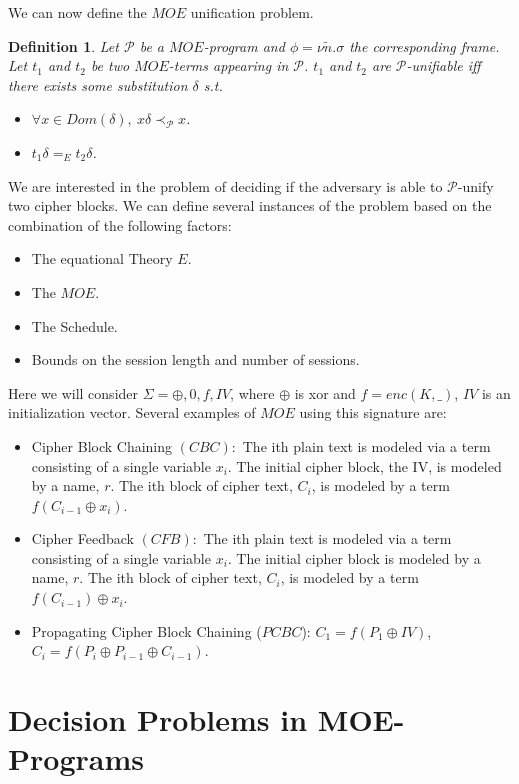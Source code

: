 \documentclass{easychair}
\newtheorem{definition}{Definition}
\begin{document}
We can now define the $MOE$ unification problem.

\begin{definition}
	Let $\mathcal{P}$ be a $MOE$-program and $\phi = \nu \tilde{n}.\sigma$ the corresponding frame. Let $t_1$ and $t_2$
	be two $MOE$-terms appearing in $\mathcal{P}$. $t_1$ and $t_2$
	are $\mathcal{P}$-unifiable iff there exists some substitution
	$\delta$ s.t.
	\begin{itemize}
		\item $\forall x \in Dom(\delta), ~x\delta \prec_{\mathcal{P}} x$.
		\item $t_1 \delta =_E t_2\delta$.
	\end{itemize}
\end{definition}

We are interested in the problem of deciding if the adversary is able to $\mathcal{P}$-unify two cipher blocks. We can define several instances of the problem based on the combination of the following factors:
\begin{itemize}
	\item The equational Theory $E$.
	\item The $MOE$.
	\item The Schedule.
	\item Bounds on the session length and number of sessions.  
\end{itemize}

Here we will consider $\Sigma ={\oplus, 0, f, IV}$, where $\oplus$ is xor and $f=enc(K,\_)$, $IV$ is an initialization vector.
Several examples of $MOE$ using this signature are: 
\begin{itemize}
	\item Cipher Block Chaining $(CBC):$ The ith plain text is modeled via a term consisting of a single variable $x_i$. The initial cipher block, the IV, is modeled by a name, $r$. The ith block of cipher text, $C_i$, is modeled by a
	term $f(C_{i-1} \oplus x_i)$.
	\item Cipher Feedback $(CFB):$ The ith plain text is modeled via a term consisting of a single variable $x_i$. The initial cipher block is modeled by a name, $r$. The ith block of cipher text, $C_i$, is modeled by a
	term $f(C_{i-1}) \oplus x_i$.  
	\item Propagating Cipher Block Chaining ($PCBC$): 
	$C_1 = f(P_1 \oplus IV)$, $C_i = f(P_i \oplus P_{i-1} \oplus C_{i-1})$.
\end{itemize}



\section{Decision Problems in MOE-Programs}
\end{document}
